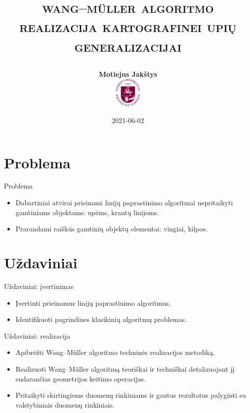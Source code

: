 \documentclass[14pt]{beamer}
\title{
    \Large\textsc{wang–müller algoritmo realizacija 
    kartografinei upių generalizacijai}

}
\author{\small \bf Motiejus Jakštys \\[4ex]
    \includegraphics[height=4em]{vu}
}
\date{\small 2021-06-02}
\newcommand{\WM}{Wang--M{\"u}ller}
\begin{document}

\begin{frame}
\titlepage
\end{frame}

\section{Problema}

\begin{frame}{Problema}
    \begin{itemize}[<+->]

        \item Dabartiniai atvirai prieinami linijų paprastinimo algoritmai
            nepritaikyti gamtiniams objektams: upėms, krantų linijoms.

        \item Prarandami raiškūs gamtinių objektų elementai: vingiai, kilpos.

    \end{itemize}
\end{frame}

\section{Uždaviniai}

\begin{frame}{Uždaviniai: įvertinimas}
    \begin{itemize}[<+->]
        \item Įvertinti prieinamus linijų paprastinimo algoritmus.
        \item Identifikuoti pagrindines klasikinių algoritmų problemas.
    \end{itemize}
\end{frame}


\begin{frame}{Uždaviniai: realizacija}
    \begin{itemize}[<+->]
        \item Apibrėžti {\WM} algoritmo techninės realizacijos metodiką.
        \item Realizuoti {\WM} algoritmą teoriškai ir techniškai detalizuojant jį
            sudarančias geometrijos keitimo operacijas.
        \item Pritaikyti skirtingiems duomenų rinkiniams ir gautus rezultatus
            palyginti su valstybiniais duomenų rinkiniais.
    \end{itemize}
\end{frame}
\end{document}
